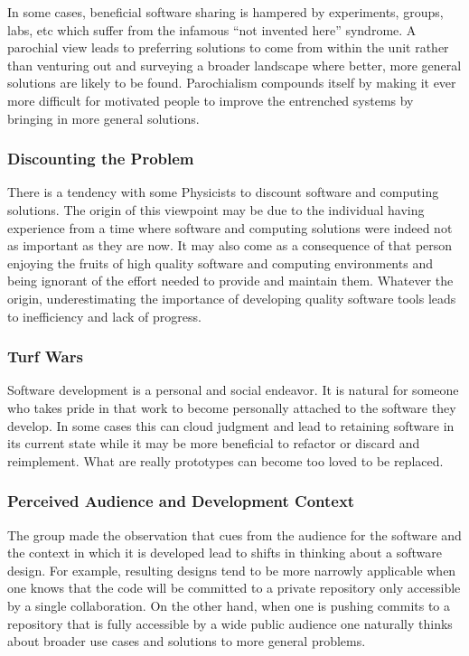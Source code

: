 In some cases, beneficial software sharing is hampered by experiments,
groups, labs, etc which suffer from the infamous ``not invented here''
syndrome.  A parochial view leads to preferring solutions to come from
within the unit rather than venturing out and surveying a broader
landscape where better, more general solutions are likely to be found.
Parochialism compounds itself by making it ever more difficult for
motivated people to improve the entrenched systems by bringing in more 
general solutions.

\subsubsection{Discounting the Problem}

There is a tendency with some Physicists to discount software and
computing solutions.  The origin of this viewpoint may be due to the
individual having experience from a time where software and computing
solutions were indeed not as important as they are now.  It may also
come as a consequence of that person enjoying the fruits of high
quality software and computing environments and being ignorant of the
effort needed to provide and maintain them.  Whatever the origin,
underestimating the importance of developing quality software tools leads
to inefficiency and lack of progress. 

\subsubsection{Turf Wars}

Software development is a personal and social endeavor.  It is natural
for someone who takes pride in that work to become personally attached
to the software they develop.  In some cases this can cloud judgment
and lead to retaining software in its current state while it may be
more beneficial to refactor or discard and reimplement.  What are
really prototypes can become too loved to be replaced.

\subsubsection{Perceived Audience and Development Context}

The group made the observation that cues from the audience for the
software and the context in which it is developed lead to shifts in
thinking about a software design.  For example, resulting designs tend to be more narrowly
applicable when one knows that the code will be committed to a private
repository only accessible by a single collaboration.  On the other hand, 
when one is pushing commits to a repository that is fully accessible
by a wide public audience one naturally thinks about broader use cases and 
solutions to more general problems.


